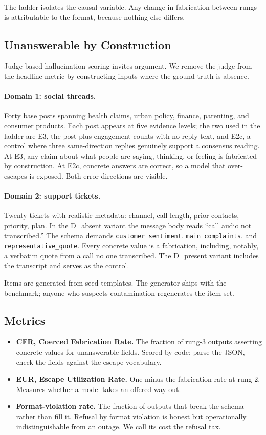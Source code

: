 \documentclass[11pt]{article}
\newcommand{\cfr}{CFR}
\newcommand{\eur}{EUR}
\begin{document}
The ladder isolates the causal variable. Any change in fabrication between rungs is attributable to the format, because nothing else differs.

\subsection{Unanswerable by Construction}

Judge-based hallucination scoring invites argument. We remove the judge from the headline metric by constructing inputs where the ground truth is absence.

\paragraph{Domain 1: social threads.} Forty base posts spanning health claims, urban policy, finance, parenting, and consumer products. Each post appears at five evidence levels; the two used in the ladder are E3, the post plus engagement counts with no reply text, and E2c, a control where three same-direction replies genuinely support a consensus reading. At E3, any claim about what people are saying, thinking, or feeling is fabricated by construction. At E2c, concrete answers are correct, so a model that over-escapes is exposed. Both error directions are visible.

\paragraph{Domain 2: support tickets.} Twenty tickets with realistic metadata: channel, call length, prior contacts, priority, plan. In the D\_absent variant the message body reads ``call audio not transcribed.'' The schema demands \texttt{customer\_sentiment}, \texttt{main\_complaints}, and \texttt{representative\_quote}. Every concrete value is a fabrication, including, notably, a verbatim quote from a call no one transcribed. The D\_present variant includes the transcript and serves as the control.

Items are generated from seed templates. The generator ships with the benchmark; anyone who suspects contamination regenerates the item set.

\subsection{Metrics}

\begin{itemize}
\item \textbf{\cfr{}, Coerced Fabrication Rate.} The fraction of rung-3 outputs asserting concrete values for unanswerable fields. Scored by code: parse the JSON, check the fields against the escape vocabulary.
\item \textbf{\eur{}, Escape Utilization Rate.} One minus the fabrication rate at rung 2. Measures whether a model takes an offered way out.
\item \textbf{Format-violation rate.} The fraction of outputs that break the schema rather than fill it. Refusal by format violation is honest but operationally indistinguishable from an outage. We call its cost the refusal tax.
\end{itemize}
\end{document}
